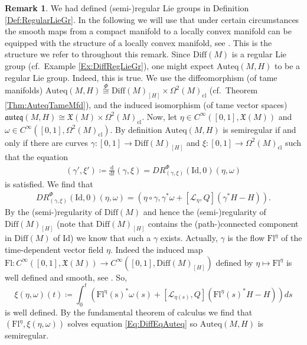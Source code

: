 \documentclass[12pt,a4paper]{article}
\theoremstyle{plain}
\theoremstyle{definition}
\newtheorem{remark}[theorem]{Remark}
\newcommand{\om}{\omega}
\newcommand{\VFs}{\mathfrak{X}(M)}
\newcommand{\Forms}[1]{\Omega^{#1}(M)}
\newcommand{\ClForms}[1]{\Forms{#1}_{\mathrm{cl}}}
\newcommand{\LieD}{\mathcal{L}}
\newcommand{\Diff}{\mathrm{Diff}(M)}
\newcommand{\SDiff}{\mathrm{Diff}(M)_{[H]}}
\newcommand{\Auteq}{\mathrm{Auteq}(M,H)}
\newcommand{\auteq}{\mathfrak{auteq}(M,H)}
\newcommand{\Id}{\mathrm{Id}}
\renewcommand{\d}{\mathrm{d}}
\begin{document}
\begin{remark}
We had defined (semi-)regular Lie groups in Definition \ref{Def:RegularLieGr}.
In the following we will use that under certain circumstances the smooth maps from a compact manifold to a locally convex manifold can be equipped with the structure of a locally convex manifold, see \cite[C.3 Construction of the Manifold Structure]{schmeding_2022}. This is the structure we refer to throughout this remark.
Since $\Diff$ is a regular Lie group (cf.~Example \ref{Ex:DiffRegLieGr}), one might expect $\Auteq$ to be a regular Lie group. Indeed, this is true.
We use the diffeomorphism (of tame manifolds) $\Auteq\stackrel{\Phi}{\cong} \SDiff\times \ClForms{2}$ (cf.~Theorem \ref{Thm:AuteqTameMfd}), and the induced isomorphism (of tame vector spaces) $\auteq \cong \VFs\times \ClForms{2}$.
Now, let $\eta\in C^\infty([0,1],\VFs)$ and $\om\in C^\infty([0,1],\ClForms{2})$. By definition $\Auteq$ is semiregular if and only if there are curves $\gamma:[0,1]\to \SDiff$ and $\xi:[0,1]\to \ClForms{2}$ such that the equation
\begin{align}
\label{Eq:DiffEqAuteq}
    (\gamma',\xi')\coloneqq\frac{\d}{\d t}(\gamma,\xi)=DR^\Phi_{(\gamma,\xi)}(\Id,0)(\eta,\omega)
\end{align}
is satisfied.
We find that
\begin{align*}
    DR^\Phi_{(\gamma,\xi)}(\Id,0)(\eta,\om)=(\eta\circ \gamma,\gamma^*\om+[\LieD_\eta,Q](\gamma^* H-H)).  
\end{align*}
By the (semi-)regularity of $\Diff$ and hence the (semi-)regularity of $\SDiff$ (note that $\SDiff$ contains the (path-)connected component in $\Diff$ of $\Id$) we know that such a $\gamma$ exists. Actually, $\gamma$ is the flow $\mathrm{Fl}^\eta$ of the time-dependent vector field $\eta$.
Indeed the induced map $\mathrm{Fl}:C^\infty([0,1],\VFs)\to C^\infty([0,1],\SDiff)$ defined by $\eta\mapsto \mathrm{Fl}^\eta$ is well defined and smooth, see \cite[Example 3.36]{schmeding_2022}.
So, $$\xi(\eta,\om)(t)\coloneqq \int_0^t(\mathrm{Fl^\eta(s)}^*\om(s)+[\LieD_{\eta(s)},Q](\mathrm{Fl}^\eta(s)^* H-H))ds$$ is well defined. By the fundamental theorem of calculus we find that $(\mathrm{Fl}^\eta,\xi(\eta,\om))$ solves equation \eqref{Eq:DiffEqAuteq} so $\Auteq$ is semiregular.


\end{remark}
\end{document}
